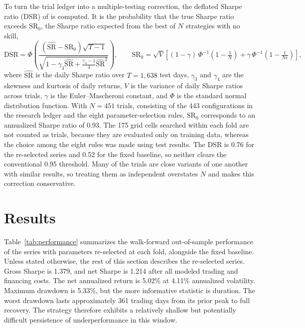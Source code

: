 \documentclass[11pt]{article}
\begin{document}
To turn the trial ledger into a multiple-testing correction, the deflated Sharpe ratio (DSR) of \citet{bailey2014} is computed. It is the probability that the true Sharpe ratio exceeds $\mathrm{SR}_0$, the Sharpe ratio expected from the best of $N$ strategies with no skill,
\begin{equation}
 \mathrm{DSR}=\Phi\!\left(\frac{(\widehat{\mathrm{SR}}-\mathrm{SR}_0)\sqrt{T-1}}{\sqrt{1-\gamma_3\widehat{\mathrm{SR}}+\frac{\gamma_4-1}{4}\widehat{\mathrm{SR}}^{2}}}\right),\qquad
 \mathrm{SR}_0=\sqrt{V}\left[(1-\gamma)\,\Phi^{-1}\!\left(1-\tfrac{1}{N}\right)+\gamma\,\Phi^{-1}\!\left(1-\tfrac{1}{Ne}\right)\right],
 \label{eq:dsr}
\end{equation}
where $\widehat{\mathrm{SR}}$ is the daily Sharpe ratio over $T=1{,}638$ test days, $\gamma_3$ and $\gamma_4$ are the skewness and kurtosis of daily returns, $V$ is the variance of daily Sharpe ratios across trials, $\gamma$ is the Euler--Mascheroni constant, and $\Phi$ is the standard normal distribution function. With $N=451$ trials, consisting of the 443 configurations in the research ledger and the eight parameter-selection rules, $\mathrm{SR}_0$ corresponds to an annualized Sharpe ratio of 0.93. The 175 grid cells searched within each fold are not counted as trials, because they are evaluated only on training data, whereas the choice among the eight rules was made using test results. The DSR is 0.76 for the re-selected series and 0.52 for the fixed baseline, so neither clears the conventional 0.95 threshold. Many of the trials are close variants of one another with similar results, so treating them as independent overstates $N$ and makes this correction conservative.

\section{Results}
\label{sec:results}

Table~\ref{tab:performance} summarizes the walk-forward out-of-sample performance of the series with parameters re-selected at each fold, alongside the fixed baseline. Unless stated otherwise, the rest of this section describes the re-selected series. Gross Sharpe is 1.379, and net Sharpe is 1.214 after all modeled trading and financing costs. The net annualized return is 5.02\% at 4.11\% annualized volatility. Maximum drawdown is 5.33\%, but the more informative statistic is duration. The worst drawdown lasts approximately 361 trading days from its prior peak to full recovery. The strategy therefore exhibits a relatively shallow but potentially difficult persistence of underperformance in this window.
\end{document}
